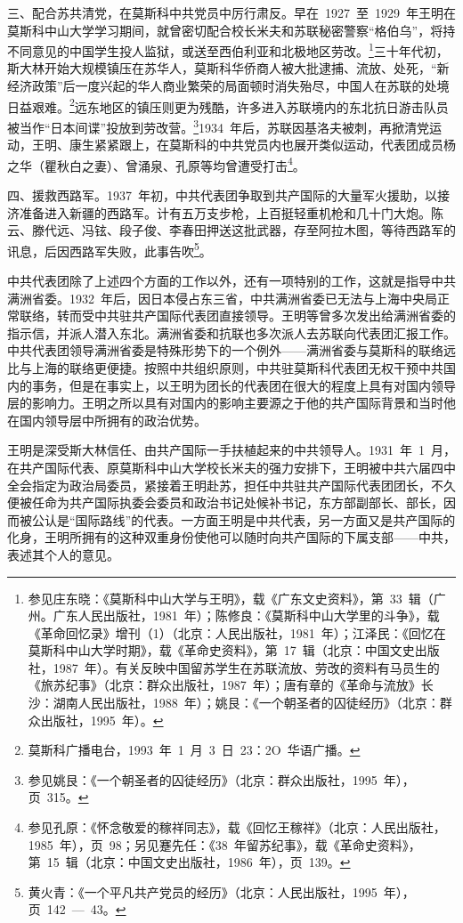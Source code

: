三、配合苏共清党，在莫斯科中共党员中厉行肃反。早在~1927~至~1929~年王明在莫斯科中山大学学习期间，就曾密切配合校长米夫和苏联秘密警察“格伯乌”，将持不同意见的中国学生投人监狱，或送至西伯利亚和北极地区劳改。\footnote{参见庄东晓：《莫斯科中山大学与王明》，载《广东文史资料》，第~33~辑（广州。广东人民出版社，1981~年）；陈修良：《莫斯科中山大学里的斗争》，载《革命回忆录》增刊（1）（北京：人民出版社，1981~年）；江泽民：《回忆在莫斯科中山大学时期》，载《革命史资料》，第~17~辑（北京：中国文史出版社，1987~年）。有关反映中国留苏学生在苏联流放、劳改的资料有马员生的《旅苏纪事》（北京：群众出版社，1987~年）；唐有章的《革命与流放》长沙：湖南人民出版社，1988~年）；姚艮：《一个朝圣者的囚徒经历》（北京：群众出版社，1995~年）。}三十年代初，斯大林开始大规模镇压在苏华人，莫斯科华侨商人被大批逮捕、流放、处死，“新经济政策”后一度兴起的华人商业繁荣的局面顿时消失殆尽，中国人在苏联的处境日益艰难。\footnote{莫斯科广播电台，1993~年~1~月~3~日~23：2O~华语广播。}远东地区的镇压则更为残酷，许多进入苏联境内的东北抗日游击队员被当作“日本间谍”投放到劳改营。\footnote{参见姚艮：《一个朝圣者的囚徒经历》（北京：群众出版社，1995~年），页~315。}1934~年后，苏联因基洛夫被刺，再掀清党运动，王明、康生紧紧跟上，在莫斯科的中共党员内也展开类似运动，代表团成员杨之华（瞿秋白之妻）、曾涌泉、孔原等均曾遭受打击\footnote{参见孔原：《怀念敬爱的稼祥同志》，载《回忆王稼祥》（北京：人民出版社，1985~年），页~98；另见蹇先任：《38~年留苏纪事》，载《革命史资料》，第~15~辑（北京：中国文史出版社，1986~年），页~139。}。

四、援救西路军。1937~年初，中共代表团争取到共产国际的大量军火援助，以接济准备进入新疆的西路军。计有五万支步枪，上百挺轻重机枪和几十门大炮。陈云、滕代远、冯铉、段子俊、李春田押送这批武器，存至阿拉木图，等待西路军的讯息，后因西路军失败，此事告吹\footnote{黄火青：《一个平凡共产党员的经历》（北京：人民出版社，1995~年），页~142~—~43。}。

中共代表团除了上述四个方面的工作以外，还有一项特别的工作，这就是指导中共满洲省委。1932~年后，因日本侵占东三省，中共满洲省委已无法与上海中央局正常联络，转而受中共驻共产国际代表团直接领导。王明等曾多次发出给满洲省委的指示信，并派人潜入东北。满洲省委和抗联也多次派人去苏联向代表团汇报工作。中共代表团领导满洲省委是特殊形势下的一个例外——满洲省委与莫斯科的联络远比与上海的联络更便捷。按照中共组织原则，中共驻莫斯科代表团无权干预中共国内的事务，但是在事实上，以王明为团长的代表团在很大的程度上具有对国内领导层的影响力。王明之所以具有对国内的影响主要源之于他的共产国际背景和当时他在国内领导层中所拥有的政治优势。

王明是深受斯大林信任、由共产国际一手扶植起来的中共领导人。1931~年~1~月，在共产国际代表、原莫斯科中山大学校长米夫的强力安排下，王明被中共六届四中全会指定为政治局委员，紧接着王明赴苏，担任中共驻共产国际代表团团长，不久便被任命为共产国际执委会委员和政治书记处候补书记，东方部副部长、部长，因而被公认是“国际路线”的代表。一方面王明是中共代表，另一方面又是共产国际的化身，王明所拥有的这种双重身份使他可以随时向共产国际的下属支部——中共，表述其个人的意见。

